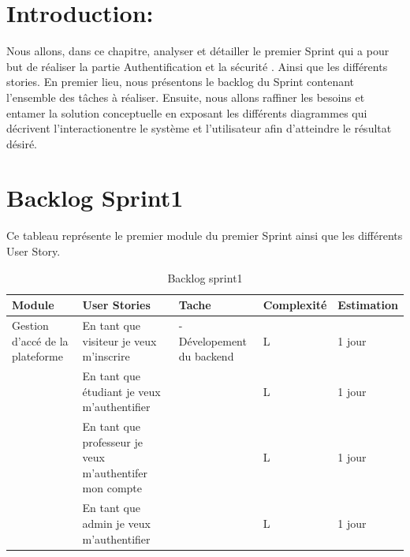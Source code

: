 
\usepackage{float}
\section{Introduction:}
Nous allons, dans ce chapitre, analyser et détailler le premier Sprint qui a pour but de réaliser la partie Authentification et la  sécurité . Ainsi que les différents stories. En premier lieu, nous présentons le backlog du Sprint
contenant l’ensemble des tâches à réaliser. Ensuite, nous allons raffiner les besoins et entamer la solution conceptuelle en exposant les différents diagrammes qui décrivent l’interactionentre le système et l’utilisateur afin d’atteindre le résultat désiré.
\section{Backlog Sprint1 }
Ce tableau représente le premier module du premier Sprint ainsi que les différents User Story.








\begin{table}[h]
    \begin{center} 
    \begin{tabular}{|p{3cm}|p{5cm}|p{3cm}|p{1.9cm}|p{2cm}|} \hline 
          Module &  User Stories &  Tache &  Complexité & Estimation \\ \hline

            Gestion d'accé de la plateforme & En tant que visiteur je veux m'inscrire   & - Dévelopement du backend & \centering L & 1 jour  \\  \hline

            & En tant que étudiant je veux m’authentifier & & \centering L & 1 jour   \\ \hline
            & En tant que professeur je veux m'authentifer mon compte& & \centering  L & 1 jour   \\ \hline
            & En tant que admin je veux m'authentifier & & \centering  L & 1 jour   \\ \hline
           




       
    \end{tabular}
  \end{center}
  \center
  \caption { Backlog sprint1}
\label{tab:bert_res}
\end{table}  




